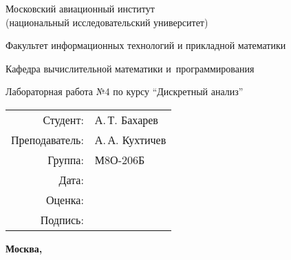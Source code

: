 \begin{titlepage}
\begin{center}
\bfseries

{\Large Московский авиационный институт\\ (национальный исследовательский университет)

}

\vspace{48pt}

{\large Факультет информационных технологий и прикладной математики
}

\vspace{36pt}


{\large Кафедра вычислительной математики и~программирования

}


\vspace{48pt}

Лабораторная работа №4 по курсу \enquote{Дискретный анализ}

\end{center}

\vspace{72pt}

\begin{flushright}
\begin{tabular}{rl}
Студент: & А.\,Т. Бахарев \\
Преподаватель: & А.\,А. Кухтичев \\
Группа: & М8О-206Б \\
Дата: & \\
Оценка: & \\
Подпись: & \\
\end{tabular}
\end{flushright}

\vfill

\begin{center}
\bfseries
Москва, \the\year
\end{center}
\end{titlepage}

\pagebreak